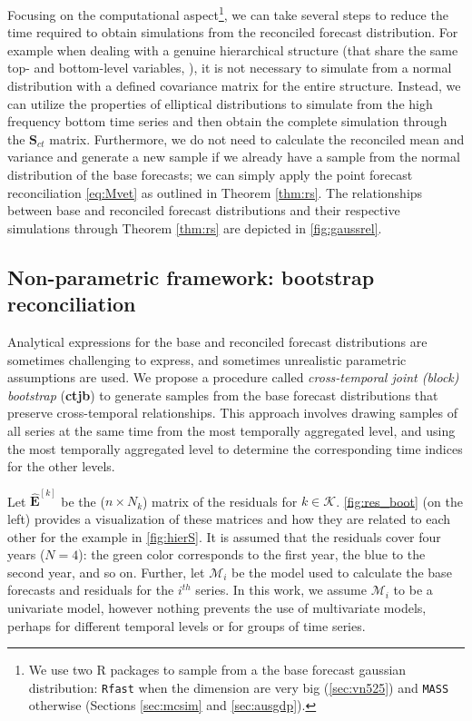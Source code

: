 \documentclass[12pt]{article}
\newcommand{\Evet}{\bm{E}}
\newcommand{\Svet}{\bm{S}}
\theoremstyle{definition}
\begin{document}


Focusing on the computational aspect\footnote{We use two R packages to sample from a the base forecast gaussian distribution: \texttt{Rfast} \citep{rfast2022} when the dimension are very big (\autoref{sec:vn525}) and \texttt{MASS} \citep{mass2002} otherwise  (Sections \ref{sec:mcsim} and \ref{sec:ausgdp}).}, we can take several steps to reduce the time required to obtain simulations from the reconciled forecast distribution. For example when dealing with a genuine hierarchical structure (that share the same top- and bottom-level variables, \citealp{giro2022}), it is not necessary to simulate from a normal distribution with a defined covariance matrix for the entire structure. Instead, we can utilize the properties of elliptical distributions to simulate from the high frequency bottom time series and then obtain the complete simulation through the $\Svet_{ct}$ matrix. Furthermore, we do not need to calculate the reconciled mean and variance and generate a new sample if we already have a sample from the normal distribution of the base forecasts; we can simply apply the point forecast reconciliation \eqref{eq:Mvet} as outlined in Theorem \ref{thm:rs}. The relationships between base and reconciled forecast distributions and their respective simulations through Theorem \ref{thm:rs} are depicted in \autoref{fig:gaussrel}.

\subsection{Non-parametric framework: bootstrap reconciliation}\label{ssec:boot}

Analytical expressions for the base and reconciled forecast distributions are sometimes challenging to express, and sometimes unrealistic parametric assumptions are used. We propose a procedure called \textit{cross-temporal joint (block) bootstrap} (\textbf{ctjb}) to generate samples from the base forecast distributions that preserve cross-temporal relationships. This approach involves drawing samples of all series at the same time from the most temporally aggregated level, and using the most temporally aggregated level to determine the corresponding time indices for the other levels.

Let $\widehat{\Evet}^{[k]}$ be the ($n \times N_k$) matrix of the residuals for $k \in \mathcal{K}$. \autoref{fig:res_boot} (on the left) provides a visualization of these matrices and how they are related to each other for the example in \autoref{fig:hierS}. It is assumed that the residuals cover four years ($N=4$): the green color corresponds to the first year, the blue to the second year, and so on. Further, let $\mathcal{M}_i$ be the model used to calculate the base forecasts and residuals for the $i^{th}$ series. In this work, we assume $\mathcal{M}_i$ to be a univariate model, however nothing prevents the use of multivariate models, perhaps for different temporal levels or for groups of time series.
\end{document}
